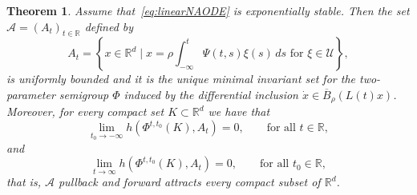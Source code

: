 \documentclass[reqno]{amsart}
\newtheorem{thm}{Theorem}[section]
\theoremstyle{definition}
\numberwithin{equation}{section}
\newcommand{\R}{\mathbb{R}}
\newcommand{\A}{\mathcal{A}}
\newcommand{\U}{\mathcal{U}}
\newcommand\note[1]{\marginpar{\flushleft\sffamily\tiny #1}}
\begin{document}

\begin{thm}\label{thm:exist-attractor}
    Assume that~\eqref{eq:linearNAODE} is exponentially stable. Then the set $\A=( A_t)_{t\in\R}$ defined by    \begin{equation}\label{eq:hyp_sols_lin}
         A_t=\left\{x\in\R^d\mid x=\rho\int_{-\infty}^t\Psi(t,s)\xi(s)\,ds\text{ for }\xi\in\U\right\},
    \end{equation}
    is uniformly bounded and it is the unique minimal invariant set for the two-parameter semigroup $\Phi$ induced by the differential inclusion $\dot x\in \overline B_\rho(L(t)x)$. Moreover, for every compact set $ K\subset\R^d$ we have that 
    \[
    \lim_{t_0\to-\infty} h(\Phi^{t,t_0}(K), A_t)=0,\qquad \text{for all } t\in\R, 
    \]
    and 
    \[
    \lim_{t\to\infty} h(\Phi^{t,t_0}(K), A_t)=0,\qquad \text{for all } t_0\in\R, 
    \]
    that is, $ \A$ pullback and forward attracts every compact subset of $\R^d$.
\end{thm}
\end{document}
